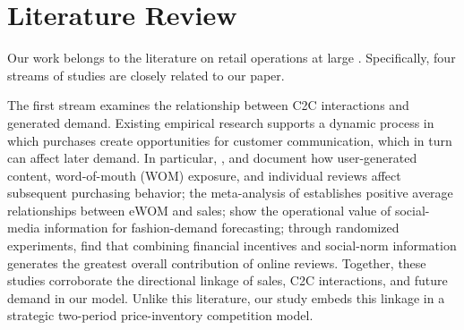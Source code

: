 \documentclass[nonblindrev,copyedit]{informs1}
\begin{document}
\section{Literature Review}\label{sec:lit}

Our work belongs to the literature on retail operations at large \citep[see a comprehensive review by][]{ckm2020}. Specifically, four streams of studies are closely related to our paper.

The first stream examines the relationship between C2C interactions and generated demand. Existing empirical research supports a dynamic process in which purchases create opportunities for customer communication, which in turn can affect later demand. In particular, \cite{goh2013,adamopoulos2018}, and \cite{vana2021} document how user-generated content, word-of-mouth (WOM) exposure, and individual reviews affect subsequent purchasing behavior; the meta-analysis of \cite{babicrosario2016} establishes positive average relationships between eWOM and sales; \cite{fu2023} show the operational value of social-media information for fashion-demand forecasting; through randomized experiments, \cite{burtch2018} find that combining financial incentives and social-norm information generates the greatest overall contribution of online reviews. Together, these studies corroborate the directional linkage of sales, C2C interactions, and future demand in our model. Unlike this literature, our study embeds this linkage in a strategic two-period price-inventory competition model.
\end{document}
